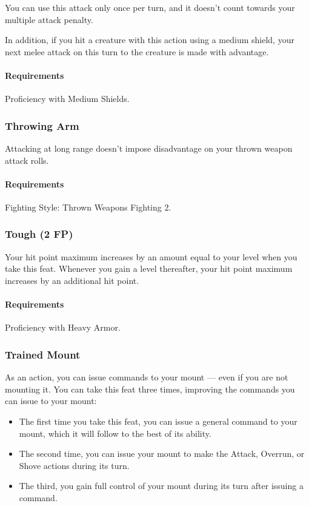     You can use this attack only once per turn, and it doesn't count towards your multiple attack penalty.

    In addition, if you hit a creature with this action using a medium shield, your next melee attack on this turn to the creature is made with advantage.
    \paragraph{Requirements} Proficiency with Medium Shields.
\subsubsection{Throwing Arm} \label{feat::throwingarm}
    Attacking at long range doesn't impose disadvantage on your thrown weapon attack rolls.
    \paragraph{Requirements} Fighting Style: Thrown Weapons Fighting 2.
\subsubsection{Tough (2 FP)} \label{feat::tough}
    Your hit point maximum increases by an amount equal to your level when you take this feat.
    Whenever you gain a level thereafter, your hit point maximum increases by an additional hit point.
    \paragraph{Requirements} Proficiency with Heavy Armor.
\subsubsection{Trained Mount} \label{feat::trainedmount}
    As an action, you can issue commands to your mount --- even if you are not mounting it.
    You can take this feat three times, improving the commands you can issue to your mount:
    \begin{itemize}
        \item The first time you take this feat, you can issue a general command to your mount, which it will follow to the best of its ability.
        \item The second time, you can issue your mount to make the Attack, Overrun, or Shove actions during its turn.
        \item The third, you gain full control of your mount during its turn after issuing a command.
    \end{itemize}
